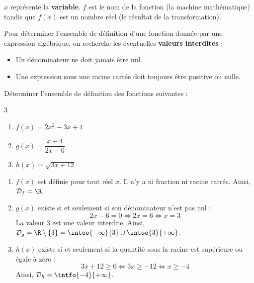 \begin{rem}
	$x$ représente la \textbf{variable}. $f$ est le nom de la fonction (la \og{}machine\fg{} mathématique) tandis que $f(x)$ est un nombre réel (le résultat de la transformation).
\end{rem}

\begin{methode}
	Pour déterminer l'ensemble de définition d'une fonction donnée par une expression algébrique, on recherche les éventuelles \textbf{valeurs interdites} :
	\begin{itemize}
		\item Un dénominateur ne doit jamais être nul.
		\item Une expression sous une racine carrée doit toujours être positive ou nulle.
	\end{itemize}

	Déterminer l'ensemble de définition des fonctions suivantes :

	\begin{multicols}{3}
		\begin{enumerate}
			\item $f(x) = 2x^2 - 3x + 1$
			\item $g(x) = \dfrac{x+4}{2x-6}$
			\item $h(x) = \sqrt{3x + 12}$
		\end{enumerate}
	\end{multicols}

	\begin{correction}
		\nline
		\begin{enumerate}
			\item $f(x)$ est définie pour tout réel $x$. Il n'y a ni fraction ni racine carrée. Ainsi, $\mathcal{D}_f = \R$.
			\item $g(x)$ existe si et seulement si son dénominateur n'est pas nul :
			      \[
				      2x - 6 = 0 \iff 2x = 6 \iff x = 3
			      \]
			      La valeur $3$ est une valeur interdite. Ainsi, $\mathcal{D}_g = \R \setminus \{3\} = \intoo{-\infty}{3} \cup \intoo{3}{+\infty}$.
			\item $h(x)$ existe si et seulement si la quantité sous la racine est supérieure ou égale à zéro :
			      \[
				      3x + 12 \ge 0 \iff 3x \ge -12 \iff x \ge -4
			      \]
			      Ainsi, $\mathcal{D}_h = \intfo{-4}{+\infty}$.
		\end{enumerate}
	\end{correction}
\end{methode}

